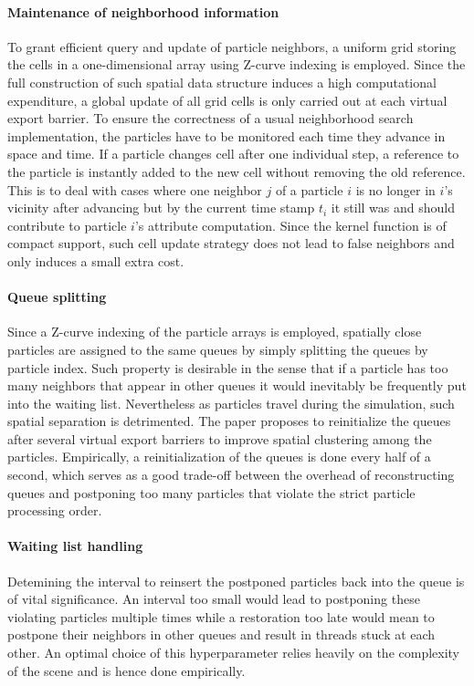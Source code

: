 \documentclass[
	11pt, 
	DIV10,
	ngerman,
	a4paper, 
	oneside, 
	headings=normal, 
	captions=tableheading,
	final, 
	numbers=noenddot
]{scrartcl}
\begin{document}
\paragraph{Maintenance of neighborhood information}
To grant efficient query and update of particle neighbors, a uniform grid storing the cells in a one-dimensional array using Z-curve indexing is employed. Since the full construction of such spatial data structure induces a high computational expenditure, a global update of all grid cells is only carried out at each virtual export barrier. To ensure the correctness of a usual neighborhood search implementation, the particles have to be monitored each time they advance in space and time. If a particle changes cell after one individual step, a reference to the particle is instantly added to the new cell without removing the old reference. This is to deal with cases where one neighbor $j$ of a particle $i$ is no longer in $i$'s vicinity after advancing but by the current time stamp $t_{i}$ it still was and should contribute to particle $i$'s attribute computation. Since the kernel function is of compact support, such cell update strategy does not lead to false neighbors and only induces a small extra cost.

\paragraph{Queue splitting}
Since a Z-curve indexing of the particle arrays is employed, spatially close particles are assigned to the same queues by simply splitting the queues by particle index. Such property is desirable in the sense that if a particle has too many neighbors that appear in other queues it would inevitably be frequently put into the waiting list. Nevertheless as particles travel during the simulation, such spatial separation is detrimented. The paper proposes to reinitialize the queues after several virtual export barriers to improve spatial clustering among the particles. Empirically, a reinitialization of the queues is done every half of a second, which serves as a good trade-off between the overhead of reconstructing queues and postponing too many particles that violate the strict particle processing order.

\paragraph{Waiting list handling}
Detemining the interval to reinsert the postponed particles back into the queue is of vital significance. An interval too small would lead to postponing these violating particles multiple times while a restoration too late would mean to postpone their neighbors in other queues and result in threads stuck at each other. An optimal choice of this hyperparameter relies heavily on the complexity of the scene and is hence done empirically.
\end{document}
